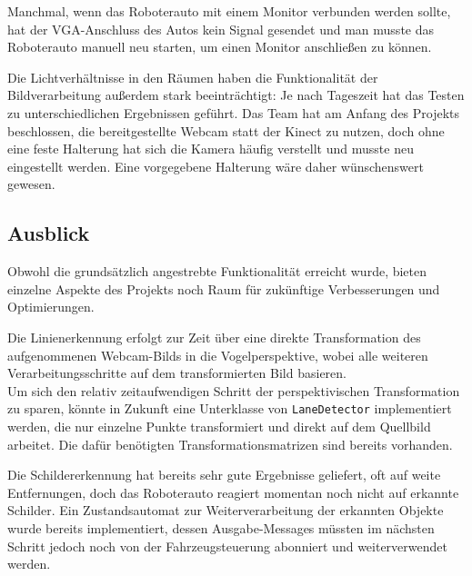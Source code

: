 Manchmal, wenn das Roboterauto mit einem Monitor verbunden werden sollte, hat der VGA-Anschluss des Autos kein Signal gesendet und man musste das Roboterauto manuell neu starten, um einen Monitor anschlie\ss{}en zu k\"onnen. 

Die Lichtverh\"altnisse in den R\"aumen haben die Funktionalit\"at der Bildverarbeitung au\ss erdem stark beeintr\"achtigt: Je nach Tageszeit hat das Testen zu unterschiedlichen Ergebnissen gef\"uhrt. Das Team hat am Anfang des Projekts beschlossen, die bereitgestellte Webcam statt der Kinect zu nutzen, doch ohne eine feste Halterung hat sich die Kamera h\"aufig verstellt und musste neu eingestellt werden. Eine vorgegebene Halterung w\"are daher w\"unschenswert gewesen.

\subsection{Ausblick}
Obwohl die grunds\"atzlich angestrebte Funktionalit\"at erreicht wurde, bieten einzelne
Aspekte des Projekts noch Raum f\"ur zuk\"unftige Verbesserungen und Optimierungen.

Die Linienerkennung erfolgt zur Zeit \"uber eine direkte Transformation des aufgenommenen
Webcam-Bilds in die Vogelperspektive, wobei alle weiteren Verarbeitungsschritte auf dem
transformierten Bild basieren.\\
Um sich den relativ zeitaufwendigen Schritt der perspektivischen Transformation zu sparen, k\"onnte
in Zukunft eine Unterklasse von \texttt{LaneDetector} implementiert werden, die
nur einzelne Punkte transformiert und direkt auf dem Quellbild arbeitet. Die daf\"ur
ben\"otigten Transformationsmatrizen sind bereits vorhanden.

Die Schildererkennung hat bereits sehr gute Ergebnisse geliefert, oft auf weite Entfernungen, doch das Roboterauto reagiert momentan noch nicht auf erkannte Schilder.
Ein Zustandsautomat zur Weiterverarbeitung der erkannten Objekte wurde bereits implementiert, dessen
Ausgabe-Messages m\"ussten im n\"achsten Schritt jedoch noch von der Fahrzeugsteuerung
abonniert und weiterverwendet werden.